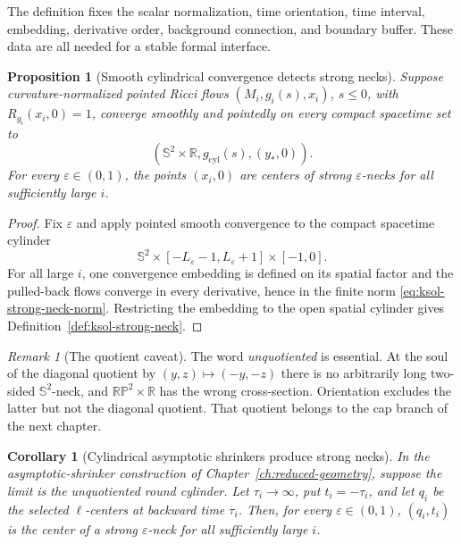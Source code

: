 \documentclass[10pt]{coll-l}
\newcommand{\R}{\mathbb{R}}
\newcommand{\Sph}{\mathbb{S}}
\newtheorem{corollary}[theorem]{Corollary}
\newtheorem{proposition}[theorem]{Proposition}
\theoremstyle{definition}
\theoremstyle{remark}
\newtheorem{remark}[theorem]{Remark}
\numberwithin{section}{chapter}
\numberwithin{equation}{chapter}
\begin{document}
The definition fixes the scalar normalization, time orientation, time
interval, embedding, derivative order, background connection, and boundary
buffer.  These data are all needed for a stable formal interface.

\begin{proposition}[Smooth cylindrical convergence detects strong necks]
\label{prop:ksol-cylindrical-convergence-neck}
Suppose curvature-normalized pointed Ricci flows
$(M_i,g_i(s),x_i)$, $s\leq0$, with $R_{g_i}(x_i,0)=1$, converge smoothly
and pointedly on every compact spacetime set to
\[
       (\Sph^2\times\R,g_{\mathrm{cyl}}(s),(y_*,0)).
\]
For every $\varepsilon\in(0,1)$, the points $(x_i,0)$ are centers of strong
$\varepsilon$-necks for all sufficiently large $i$.
\end{proposition}

\begin{proof}
Fix $\varepsilon$ and apply pointed smooth convergence to the compact
spacetime cylinder
\[
 \Sph^2\times[-L_\varepsilon-1,L_\varepsilon+1]\times[-1,0].
\]
For all large $i$, one convergence embedding is defined on its spatial
factor and the pulled-back flows converge in every derivative, hence in the
finite norm \eqref{eq:ksol-strong-neck-norm}.  Restricting the embedding to
the open spatial cylinder gives Definition~\ref{def:ksol-strong-neck}.
\end{proof}

\begin{remark}[The quotient caveat]
\label{rem:ksol-strong-neck-quotients}
The word \emph{unquotiented} is essential.  At the soul of the diagonal
quotient by $(y,z)\mapsto(-y,-z)$ there is no arbitrarily long two-sided
$\Sph^2$-neck, and $\mathbb{RP}^2\times\R$ has the wrong cross-section.
Orientation excludes the latter but not the diagonal quotient.  That
quotient belongs to the cap branch of the next chapter.
\end{remark}

\begin{corollary}[Cylindrical asymptotic shrinkers produce strong necks]
\label{cor:ksol-asymptotic-cylinder-necks}
In the asymptotic-shrinker construction of
Chapter~\ref{ch:reduced-geometry}, suppose the limit is the unquotiented
round cylinder.  Let $\tau_i\to\infty$, put $t_i=-\tau_i$, and let $q_i$
be the selected $\ell$-centers at backward time $\tau_i$.  Then, for every
$\varepsilon\in(0,1)$, $(q_i,t_i)$ is the center of a strong
$\varepsilon$-neck for all sufficiently large $i$.
\end{corollary}
\end{document}
